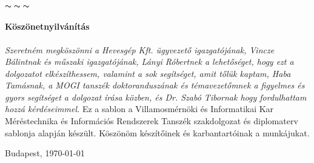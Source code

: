 \chapter*{\eloszo}

\begin{center}
    $\thicksim \; \thicksim \; \thicksim$
\end{center}


\subsubsection*{Köszönetnyilvánítás}
\emph{Szeretném megköszönni a Hevesgép Kft. ügyvezető igazgatójának, Vincze Bálintnak és műszaki igazgatójának, Lányi Róbertnek a lehetőséget, hogy ezt a dolgozatot elkészíthessem, valamint a sok segítséget, amit tőlük kaptam, Haba Tamásnak, a MOGI tanszék doktoranduszának és témavezetőmnek a figyelmes és gyors segítséget a dolgozat írása közben, és Dr. Szabó Tibornak hogy fordulhattam hozzá kérdéseimmel.}
Ez a sablon a Villamosmérnöki és Informatikai Kar Méréstechnika és Információs Rendszerek Tanszék szakdolgozat és diplomaterv sablonja alapján készült. Köszönöm készítőinek és karbantartóinak a munkájukat.


\vspace{0.5cm}

\begin{flushleft}
{Budapest, \today}
\end{flushleft}

\begin{flushright}
\emph{\authorName}
\end{flushright}

\vfill
